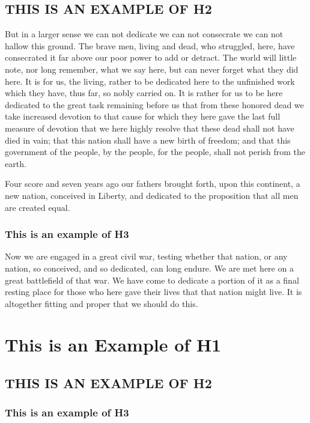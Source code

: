 \documentclass{roffin}
\begin{document}
\subsection{THIS IS AN EXAMPLE OF H2}

But in a larger sense we can not dedicate we can not consecrate we can not hallow this ground. The brave men, living and dead,
who struggled, here, have consecrated it far above our poor power to add or detract. The world will little note, nor long remember,
what we say here, but can never forget what they did here. It is for us, the living, rather to be dedicated here to the unfinished work
which they have, thus far, so nobly carried on. It is rather for us to be here dedicated to the great task remaining before us that
from these honored dead we take increased devotion to that cause for which they here gave the last full measure of devotion that
we here highly resolve that these dead shall not have died in vain; that this nation shall have a new birth of freedom; and that this
government of the people, by the people, for the people, shall not perish from the earth.

Four score and seven years ago our fathers brought forth,
upon this continent, a new nation, conceived in Liberty, and dedicated to
the proposition that all men are created equal.

\subsubsection{This is an example of H3}

Now we are engaged in a great civil war, testing whether that nation, or any nation, so conceived, and so dedicated, can long endure.
We are met here on a great battlefield of that war. We have come to dedicate a portion of it as a final resting place for those who
here gave their lives that that nation might live. It is altogether fitting and proper that we should do this.

\section{This is an Example of H1}
\subsection{THIS IS AN EXAMPLE OF H2}
\subsubsection{This is an example of H3}
\end{document}
